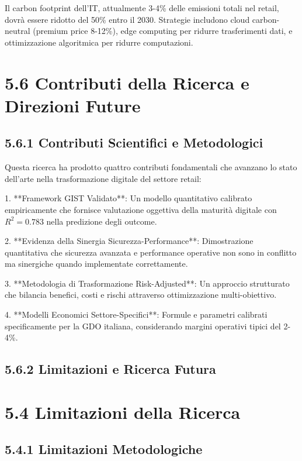 Il carbon footprint dell'IT, attualmente 3-4\% delle emissioni totali nel retail, dovrà essere ridotto del 50\% entro il 2030. Strategie includono cloud carbon-neutral (premium price 8-12\%), edge computing per ridurre trasferimenti dati, e ottimizzazione algoritmica per ridurre computazioni.

\section{5.6 Contributi della Ricerca e Direzioni Future}

\subsection{5.6.1 Contributi Scientifici e Metodologici}

Questa ricerca ha prodotto quattro contributi fondamentali che avanzano lo stato dell'arte nella trasformazione digitale del settore retail:

1. **Framework GIST Validato**: Un modello quantitativo calibrato empiricamente che fornisce valutazione oggettiva della maturità digitale con $R^2 = 0.783$ nella predizione degli outcome.

2. **Evidenza della Sinergia Sicurezza-Performance**: Dimostrazione quantitativa che sicurezza avanzata e performance operative non sono in conflitto ma sinergiche quando implementate correttamente.

3. **Metodologia di Trasformazione Risk-Adjusted**: Un approccio strutturato che bilancia benefici, costi e rischi attraverso ottimizzazione multi-obiettivo.

4. **Modelli Economici Settore-Specifici**: Formule e parametri calibrati specificamente per la GDO italiana, considerando margini operativi tipici del 2-4\%.

\subsection{5.6.2 Limitazioni e Ricerca Futura}

\section{5.4 Limitazioni della Ricerca}

\subsection{5.4.1 Limitazioni Metodologiche}

